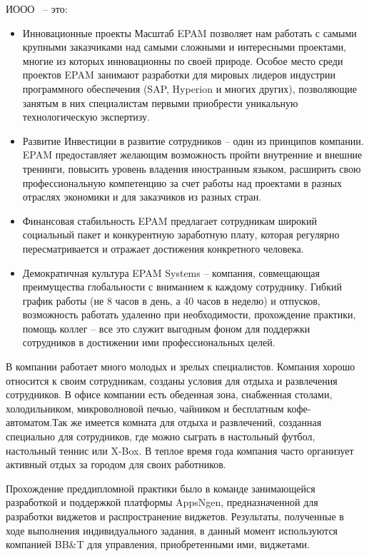 ИООО~\company{} – это:
\begin{itemize}
  \item Инновационные проекты
  Масштаб EPAM позволяет нам работать с самыми крупными заказчиками над самыми сложными и интересными проектами, многие из которых инновационны по своей природе. Особое место среди проектов EPAM занимают разработки для мировых лидеров индустрии программного обеспечения (SAP, Hyperion и многих других), позволяющие занятым в них специалистам первыми приобрести уникальную технологическую экспертизу.
  \item Развитие
  Инвестиции в развитие сотрудников – один из принципов компании. EPAM предоставляет желающим возможность пройти внутренние и внешние тренинги, повысить уровень владения иностранным языком, расширить свою профессиональную компетенцию за счет работы над проектами в разных отраслях экономики и для заказчиков из разных стран.
  \item Финансовая стабильность
  EPAM предлагает сотрудникам широкий социальный пакет и конкурентную заработную плату, которая регулярно пересматривается и отражает достижения конкретного человека.
  \item Демократичная культура
  EPAM Systems – компания, совмещающая преимущества глобальности с вниманием к каждому сотруднику. Гибкий график работы (не 8 часов в день, а 40 часов в неделю) и отпусков, возможность работать удаленно при необходимости, прохождение практики, помощь коллег – все это служит выгодным фоном для поддержки сотрудников в достижении ими профессиональных целей.
\end{itemize}

В компании работает много молодых и зрелых специалистов.
Компания хорошо относится к своим сотрудникам, созданы условия для отдыха и развлечения сотрудников.
В офисе компании есть обеденная зона, снабженная столами, холодильником, микроволновой печью, чайником и бесплатным кофе-автоматом.Так же имеется комната для отдыха и развлечений, созданная специально для сотрудников, где можно сыграть в настольный футбол, настольный теннис или X-Box. В теплое время года компания часто организует активный отдых за городом для своих работников.

Прохождение преддипломной практики было в команде занимающейся разработкой и поддержкой платформы AppsNgen, предназначенной для разработки виджетов и распространение виджетов.
Результаты, полученные в ходе выполнения индивидуального задания, в данный момент используются компанией BB\&T для управления, приобретенными ими, виджетами.
